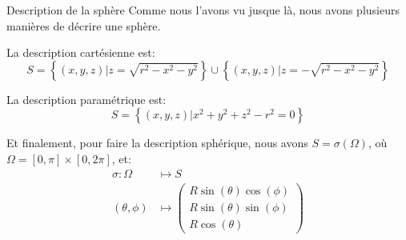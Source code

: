 \documentclass[a4paper]{article}
\begin{document}
\begin{parag}{Description de la sphère}
    Comme nous l'avons vu jusque là, nous avons plusieurs manières de décrire une sphère.

    La description cartésienne est:
    \[S = \left\{\left(x, y, z\right) | z = \sqrt{r^2 - x^2 - y^2}\right\} \cup \left\{\left(x, y, z\right) | z = -\sqrt{r^2 - x^2- y^2}\right\}\]

    La description paramétrique est:
    \[S = \left\{\left(x, y, z\right) | x^2 + y^2 + z^2 - r^2 = 0\right\}\]

    Et finalement, pour faire la description sphérique, nous avons $S = \sigma\left(\Omega\right)$, où $\Omega = \left[0, \pi\right]\times \left[0, 2\pi\right]$, et:
    \[\begin{split}
    \sigma: \Omega &\longmapsto S \\
    \left(\theta, \phi\right) &\longmapsto \begin{pmatrix} R \sin\left(\theta\right) \cos\left(\phi\right) \\ R\sin\left(\theta\right) \sin\left(\phi\right) \\ R\cos\left(\theta\right) \end{pmatrix} 
    \end{split}\]

\end{parag}
\end{document}
